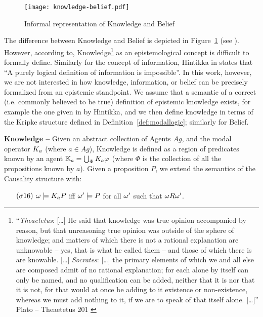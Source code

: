 \begin{figure}[t]
	\centering
	\texttt{[image: knowledge-belief.pdf]}
	\caption{Informal representation of Knowledge and Belief}
	\label{fig:knowledge-belief}
\end{figure}

The difference between Knowledge and Belief is depicted in
Figure~\ref{fig:knowledge-belief} (see \autocite{wiki-knowledgebelief}).  However,
according to\autocite{Gettier2012knowledge},
Knowledge\footnote{``\emph{Theaetetus}: [\ldots] He said that knowledge was
true opinion accompanied by reason, but that unreasoning true opinion was
outside of the sphere of knowledge; and matters of which there is not a
rational explanation are unknowable -- yes, that is what he called them -- and
those of which there is are knowable. [\ldots] \emph{Socrates}: [\ldots] the
primary elements of which we and all else are composed admit of no rational
explanation; for each alone by itself can only be named, and no qualification
can be added, neither that it is nor that it is not, for that would at once be
adding to it existence or non-existence, whereas we must add nothing to it, if
we are to speak of that itself alone.  [\ldots]'' Plato -- Theaetetus 201
\autocite{Plato1914Plato}} as an epistemological concept is difficult to formally define. 
Similarly for the concept of information, Hintikka in \autocite{Hintikka1993Information}
states that ``A purely logical definition of information is impossible''.
In this work, however, we are not interested in how knowledge, information, or
belief can be precisely formalized from an epistemic standpoint.  We assume
that a semantic of a correct (i.e. commonly believed to be true) definition of epistemic knowledge exists, for
example the one given in\autocite{Hintikka1962knowledge} by Hintikka, and we
then define knowledge in terms of the Kripke structure defined in
Definition~\ref{def:modallogic}; similarly for Belief.

\begin{definition}{\bf Knowledge --}\label{def:knowledge}
Given an abstract collection of Agents $Ag$, and the modal operator
	$K_{a}$ (where $a\in Ag$), Knowledge is defined as a region 
	of predicates known by an agent $\mathbb{K}_{a}=\bigcup_\Phi K_{a}\varphi$ 
	(where $\Phi$ is the collection of all the propositions known by $a$).
	Given a proposition $P$, we extend the semantics of the Causality structure with:
	\begin{enumerate}[noitemsep]
		\item[$(\sigma16)$] $\omega\models K_{a}P$ iff
			$\omega'\models P$ for all $\omega'$ such that
			$\omega R\omega'$.
	\end{enumerate}
\end{definition}

